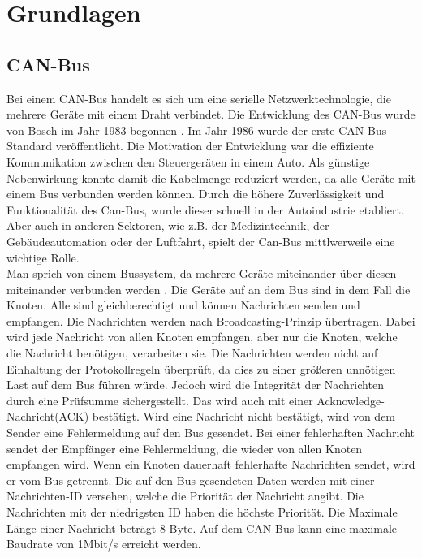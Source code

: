 \chapter{Grundlagen}


\section{CAN-Bus}
Bei einem CAN-Bus handelt es sich um eine serielle Netzwerktechnologie, 
die mehrere Geräte mit einem Draht verbindet.
Die Entwicklung des CAN-Bus wurde von Bosch im Jahr 1983 begonnen \cite[Seiten 2-10]{Voss2008}. 
Im Jahr 1986 wurde der erste CAN-Bus Standard 
veröffentlicht.
Die Motivation der Entwicklung war die effiziente Kommunikation zwischen den Steuergeräten in einem Auto. 
Als günstige
Nebenwirkung konnte damit die Kabelmenge reduziert werden, da alle Geräte mit einem Bus verbunden werden können.
Durch die höhere Zuverlässigkeit und Funktionalität des Can-Bus, wurde dieser schnell in der Autoindustrie etabliert.
Aber auch in anderen Sektoren, wie z.B. der Medizintechnik, der Gebäudeautomation oder der Luftfahrt, spielt der
Can-Bus mittlwerweile eine wichtige Rolle.
\\
Man sprich von einem Bussystem, da mehrere Geräte miteinander über diesen miteinander verbunden werden \cite[Seiten 13-19]{Voss2008}. 
Die Geräte auf an dem Bus sind in dem Fall die Knoten. Alle sind gleichberechtigt und können Nachrichten senden und empfangen.
Die Nachrichten werden nach Broadcasting-Prinzip übertragen. Dabei wird jede Nachricht von allen Knoten empfangen, 
aber nur die Knoten, welche die Nachricht benötigen, verarbeiten sie. 
Die Nachrichten werden nicht auf Einhaltung der Protokollregeln 
überprüft, da dies zu einer größeren unnötigen Last auf dem Bus führen würde. 
Jedoch wird die Integrität der Nachrichten durch eine Prüfsumme sichergestellt. Das wird auch mit 
einer Acknowledge-Nachricht(ACK) bestätigt. Wird eine Nachricht nicht bestätigt, wird von dem Sender eine Fehlermeldung
auf den Bus gesendet.
Bei einer fehlerhaften Nachricht sendet der Empfänger eine Fehlermeldung, die wieder von allen Knoten empfangen wird.
Wenn ein Knoten dauerhaft fehlerhafte
Nachrichten sendet, wird er vom Bus getrennt. Die auf den Bus gesendeten Daten werden mit einer Nachrichten-ID
versehen, welche die Priorität der Nachricht angibt. Die Nachrichten mit der niedrigsten ID haben die höchste Priorität.
Die Maximale Länge einer Nachricht beträgt 8 Byte. 
Auf dem CAN-Bus kann eine maximale Baudrate von 1Mbit/s erreicht werden.
